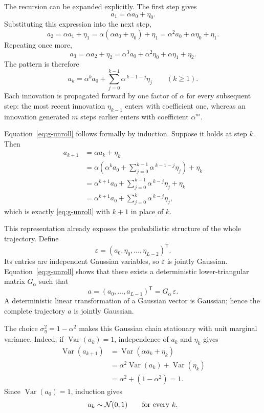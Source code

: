 The recursion can be expanded explicitly. The first step gives
\[
  a_1 = \alpha a_0+\eta_0.
\]
Substituting this expression into the next step,
\[
  a_2
  =\alpha a_1+\eta_1
  =\alpha(\alpha a_0+\eta_0)+\eta_1
  =\alpha^2a_0+\alpha\eta_0+\eta_1.
\]
Repeating once more,
\[
  a_3
  =\alpha a_2+\eta_2
  =\alpha^3a_0+\alpha^2\eta_0+\alpha\eta_1+\eta_2.
\]
The pattern is therefore
\begin{equation}
  \boxed{
  a_k
  =\alpha^k a_0
  +\sum_{j=0}^{k-1}\alpha^{\,k-1-j}\eta_j
  }
  \qquad (k\geq1).
  \label{eq:g-unroll}
\end{equation}
Each innovation is propagated forward by one factor of $\alpha$ for every
subsequent step: the most recent innovation $\eta_{k-1}$ enters with
coefficient one, whereas an innovation generated $m$ steps earlier enters
with coefficient $\alpha^m$.

Equation~\eqref{eq:g-unroll} follows formally by induction. Suppose it holds
at step $k$. Then
\begin{align}
  a_{k+1}
  &=\alpha a_k+\eta_k \\
  &=\alpha
    \left(
      \alpha^k a_0
      +\sum_{j=0}^{k-1}\alpha^{\,k-1-j}\eta_j
    \right)
    +\eta_k \\
  &=\alpha^{k+1}a_0
    +\sum_{j=0}^{k-1}\alpha^{\,k-j}\eta_j
    +\eta_k \\
  &=\alpha^{k+1}a_0
    +\sum_{j=0}^{k}\alpha^{\,k-j}\eta_j,
\end{align}
which is exactly \eqref{eq:g-unroll} with $k+1$ in place of $k$.

This representation already exposes the probabilistic structure of the
whole trajectory. Define
\[
  \varepsilon
  =
  (a_0,\eta_0,\ldots,\eta_{L-2})^{\mathsf T}.
\]
Its entries are independent Gaussian variables, so $\varepsilon$ is jointly
Gaussian. Equation~\eqref{eq:g-unroll} shows that there exists a deterministic
lower-triangular matrix $G_\alpha$ such that
\begin{equation}
  a
  =
  (a_0,\ldots,a_{L-1})^{\mathsf T}
  =
  G_\alpha\,\varepsilon.
  \label{eq:g-linear-map}
\end{equation}
A deterministic linear transformation of a Gaussian vector is Gaussian;
hence the complete trajectory $a$ is jointly Gaussian.

The choice $\sigma_\eta^2=1-\alpha^2$ makes this Gaussian chain stationary
with unit marginal variance. Indeed, if $\operatorname{Var}(a_k)=1$, independence of
$a_k$ and $\eta_k$ gives
\begin{align}
  \operatorname{Var}(a_{k+1})
  &=\operatorname{Var}(\alpha a_k+\eta_k) \\
  &=\alpha^2\operatorname{Var}(a_k)+\operatorname{Var}(\eta_k) \\
  &=\alpha^2+(1-\alpha^2)
  =1.
\end{align}
Since $\operatorname{Var}(a_0)=1$, induction gives
\begin{equation}
  a_k\sim\mathcal{N}(0,1)
  \qquad\text{for every }k.
  \label{eq:g-stationary-marginal}
\end{equation}


